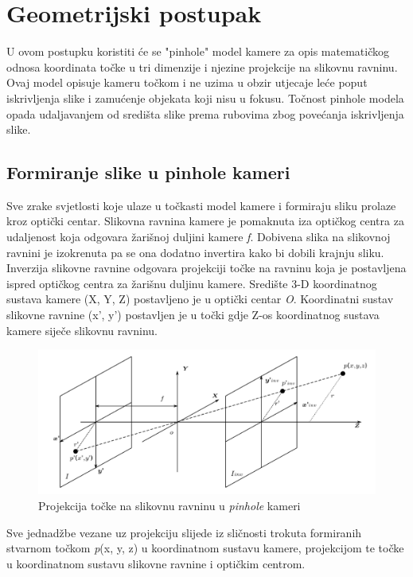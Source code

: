 \documentclass[times, utf8, diplomski]{fer}
\begin{document}
\section{Geometrijski postupak}
U ovom postupku koristiti će se "pinhole" model kamere za opis matematičkog odnosa koordinata točke u tri dimenzije i njezine projekcije na slikovnu ravninu. Ovaj model opisuje kameru točkom i ne uzima u obzir utjecaje leće poput iskrivljenja slike i zamućenje objekata koji nisu u fokusu. Točnost pinhole modela opada udaljavanjem od središta slike prema rubovima zbog povećanja iskrivljenja slike.

\subsection{Formiranje slike u pinhole kameri}
Sve zrake svjetlosti koje ulaze u točkasti model kamere i formiraju sliku prolaze kroz optički centar. Slikovna ravnina kamere je pomaknuta iza optičkog centra za udaljenost koja odgovara žarišnoj duljini kamere \textit{f}. Dobivena slika na slikovnoj ravnini je izokrenuta pa se ona dodatno invertira kako bi dobili krajnju sliku. Inverzija slikovne ravnine odgovara projekciji točke na ravninu koja je postavljena ispred optičkog centra za žarišnu duljinu kamere. Središte 3-D koordinatnog sustava kamere (X, Y, Z) postavljeno je u optički centar \textit{O}. Koordinatni sustav slikovne ravnine (x', y') postavljen je u točki gdje Z-os koordinatnog sustava kamere siječe slikovnu ravninu.

\begin{figure}[h]
\centering
\includegraphics[width=.9\textwidth]{projekcija}
\caption{Projekcija točke na slikovnu ravninu u \textit{pinhole} kameri}
\label{fig:projekcija}
\end{figure}

Sve jednadžbe vezane uz projekciju slijede iz sličnosti trokuta formiranih stvarnom točkom \textit{p}(x, y, z) u koordinatnom sustavu kamere, projekcijom te točke u koordinatnom sustavu slikovne ravnine i optičkim centrom.
\end{document}
